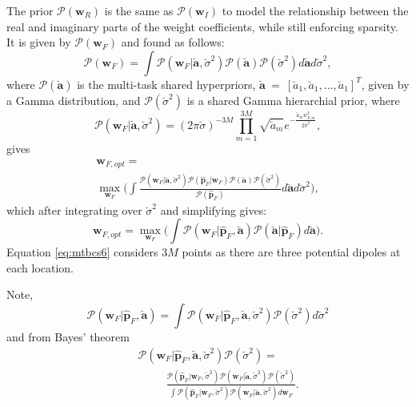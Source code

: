 \documentclass[10pt,final]{IEEEtran}
\begin{document}
The prior $\mathcal{P}(\textbf{w}_{R})$ is the same as $\mathcal{P}(\textbf{w}_{I})$ to model the relationship between the real and imaginary parts of the weight coefficients, while still enforcing sparsity.  It is given by $\mathcal{P}(\textbf{w}_{F})$ and found as follows:
\begin{equation}\label{eq:mtbcs5}
  \mathcal{P}(\textbf{w}_{F})=\int\mathcal{P}(\textbf{w}_{F}|\breve{\textbf{a}},\breve{\sigma}^{2})\mathcal{P}(\breve{\textbf{a}})\mathcal{P}(\breve{\sigma}^{2})d\breve{\textbf{a}}d\breve{\sigma}^{2},
\end{equation}
where $\mathcal{P}(\breve{\textbf{a}})$ is the multi-task shared hyperpriors, $\breve{\textbf{a}}~=~[\breve{a}_{1}, \breve{a}_{1}, ..., \breve{a}_{1}]^{T}$, given by a Gamma distribution, and $\mathcal{P}(\breve{\sigma}^{2})$ is a shared Gamma hierarchial prior, where
\begin{equation}\label{eq:mtbcs6}
  \mathcal{P}(\textbf{w}_{F}|\breve{\textbf{a}},\breve{\sigma}^{2})=(2\pi\breve{\sigma})^{-3M}\prod_{m=1}^{3M}\sqrt{\breve{a}_{m}}e^{-\frac{\breve{a}_{m}w_{F,m}^{2}}{2\breve{\sigma}^{2}}},
\end{equation}
gives
\begin{eqnarray}\label{eq:mtbcs7}\nonumber
  \textbf{w}_{F,opt} =\;\;\;\;\;\;\;\;\;\;\;\;\;\;\;\;\;\;\;\;\;\;\;\;\;\;\;\;\;\;\;\;\;\;\;\\  \max\limits_{\textbf{w}_{F}}\bigg(\int\frac{\mathcal{P}(\textbf{w}_{F}|\breve{\textbf{a}},\breve{\sigma}^{2})\mathcal{P}(\hat{\textbf{p}}_{F}|\textbf{w}_{F})\mathcal{P}(\breve{\textbf{a}})\mathcal{P}(\breve{\sigma}^{2})}{\mathcal{P}(\hat{\textbf{p}}_{F})}d\breve{\textbf{a}}d\breve{\sigma}^{2} \Bigg),
\end{eqnarray}
which after integrating over $\breve{\sigma}^{2}$ and simplifying gives:
\begin{equation}\label{eq:mtbcs8}
  \textbf{w}_{F,opt} = \max\limits_{\textbf{w}_{F}}\bigg(\int\mathcal{P}(\textbf{w}_{F}|\hat{\textbf{p}}_{F},\breve{\textbf{a}})\mathcal{P}(\breve{\textbf{a}}|\hat{\textbf{p}}_{F})d\breve{\textbf{a}} \Bigg).
\end{equation}
Equation \eqref{eq:mtbcs6} considers $3M$ points as there are three potential dipoles at each location.

Note,
\begin{equation}\label{eq:mtbcs9}
  \mathcal{P}(\textbf{w}_{F}|\hat{\textbf{p}}_{F},\breve{\textbf{a}})=\int\mathcal{P}(\textbf{w}_{F}|\hat{\textbf{p}}_{F},\breve{\textbf{a}},\breve{\sigma}^{2})\mathcal{P}(\breve{\sigma}^{2})d\breve{\sigma}^{2}
\end{equation}
and from Bayes' theorem
\begin{eqnarray}\label{eq:mtbcs10}\nonumber
 &\;& \mathcal{P}(\textbf{w}_{F}|\hat{\textbf{p}}_{F},\breve{\textbf{a}},\breve{\sigma}^{2})\mathcal{P}(\breve{\sigma}^{2})=\\ &&\;\;\;\;\;\;\;\;\;\frac{\mathcal{P}(\hat{\textbf{p}}_{F}|\textbf{w}_{F},\breve{\sigma}^{2})\mathcal{P}(\textbf{w}_{F}|\breve{\textbf{a}},\breve{\sigma}^{2})\mathcal{P}(\breve{\sigma}^{2})}{\int\mathcal{P}(\hat{\textbf{p}}_{F}|\textbf{w}_{F},\breve{\sigma}^{2})\mathcal{P}(\textbf{w}_{F}|\breve{\textbf{a}},\breve{\sigma}^{2})d\textbf{w}_{F}}.
\end{eqnarray}
\end{document}
